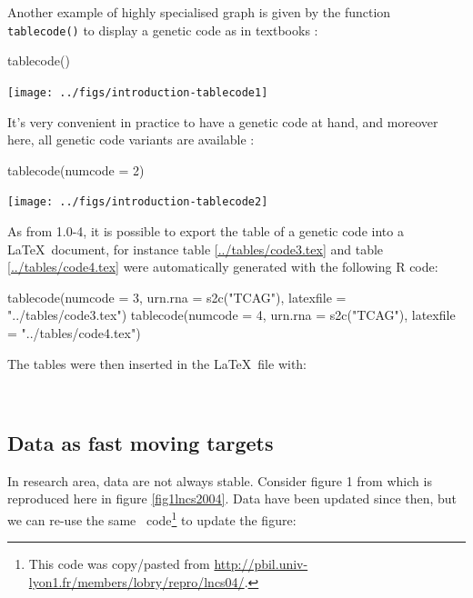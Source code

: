 \documentclass{article}
\begin{document}
Another example of highly specialised graph is given by the function \texttt{tablecode()} to
display a genetic code as in textbooks :

\begin{Schunk}
\begin{Sinput}
 tablecode()
\end{Sinput}
\end{Schunk}
\texttt{[image: ../figs/introduction-tablecode1]}

It's very convenient in practice to have a genetic code at hand, and moreover here,
all genetic code variants are available :

\begin{Schunk}
\begin{Sinput}
 tablecode(numcode = 2)
\end{Sinput}
\end{Schunk}
\texttt{[image: ../figs/introduction-tablecode2]}

As from \seqinr{} 1.0-4, it is possible to export the table of a genetic code into a \LaTeX~document,
for instance table \ref{../tables/code3.tex} and table \ref{../tables/code4.tex} were automatically generated with the following R code:

\begin{Schunk}
\begin{Sinput}
 tablecode(numcode = 3, urn.rna = s2c("TCAG"), latexfile = "../tables/code3.tex")
 tablecode(numcode = 4, urn.rna = s2c("TCAG"), latexfile = "../tables/code4.tex")
\end{Sinput}
\end{Schunk}




The tables were then inserted in the \LaTeX~file with:
\begin{verbatim}


\end{verbatim}

\subsection{Data as fast moving targets}
 
In research area, data are not always stable. 
Consider figure 1 from \cite{lobrylncs} which is reproduced here in figure \ref{fig1lncs2004}.
Data have been updated since then, but we can re-use  the same \Rlogo{}~code\footnote{
This code was copy/pasted from \url{http://pbil.univ-lyon1.fr/members/lobry/repro/lncs04/}.
}
to update the figure:
\end{document}
